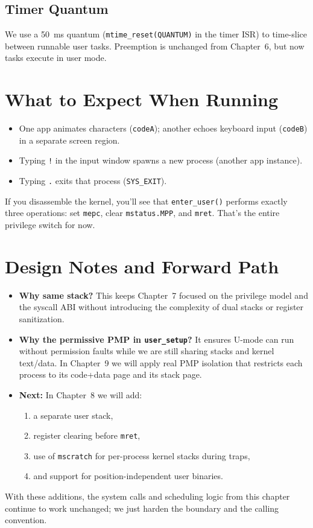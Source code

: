 \begin{figure}[H]
\centering

\end{figure}

\subsection*{Timer Quantum}

We use a 50~ms quantum (\texttt{mtime\_reset(QUANTUM)} in the timer ISR) to time-slice between runnable user tasks.  Preemption is unchanged from Chapter~6, but now tasks execute in user mode.

\section{What to Expect When Running}

\begin{itemize}
  \item One app animates characters (\texttt{codeA}); another echoes keyboard input (\texttt{codeB}) in a separate screen region.
  \item Typing \texttt{!} in the input window spawns a new process (another app instance).
  \item Typing \texttt{.} exits that process (\texttt{SYS\_EXIT}).
\end{itemize}

If you disassemble the kernel, you’ll see that \texttt{enter\_user()} performs exactly three operations: set \texttt{mepc}, clear \texttt{mstatus.MPP}, and \texttt{mret}.  That’s the entire privilege switch for now.

\section{Design Notes and Forward Path}

\begin{itemize}
  \item \textbf{Why same stack?}  This keeps Chapter~7 focused on the privilege model and the syscall ABI without introducing the complexity of dual stacks or register sanitization.
  \item \textbf{Why the permissive PMP in \texttt{user\_setup}?}  It ensures U-mode can run without permission faults while we are still sharing stacks and kernel text/data.  In Chapter~9 we will apply real PMP isolation that restricts each process to its code+data page and its stack page.
  \item \textbf{Next:}  In Chapter~8 we will add:
    \begin{enumerate}
      \item a separate user stack,
      \item register clearing before \texttt{mret},
      \item use of \texttt{mscratch} for per-process kernel stacks during traps,
      \item and support for position-independent user binaries.
    \end{enumerate}
\end{itemize}

With these additions, the system calls and scheduling logic from this chapter continue to work unchanged; we just harden the boundary and the calling convention.
